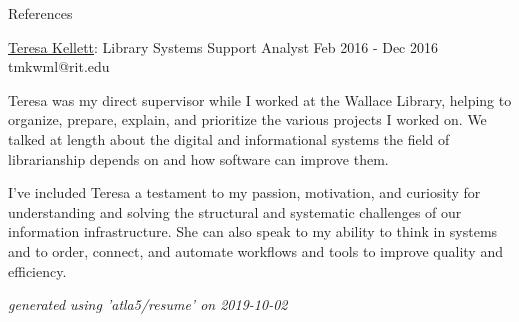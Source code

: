 \documentclass{resume} %
\begin{document}
\begin{rSection}{References}
\begin{rSubsection}{\underline{Teresa Kellett}: Library Systems Support Analyst }{ Feb 2016 - Dec 2016 }{tmkwml@rit.edu}
      \item Teresa was my direct supervisor while I worked at the Wallace Library, helping to organize, prepare, explain, and prioritize the various projects I worked on. We talked at length about the digital and informational systems the field of librarianship depends on and how software can improve them. \newline

      \item I've included Teresa a testament to my passion, motivation, and curiosity for understanding and solving the structural and systematic challenges of our information infrastructure. She can also speak to my ability to think in systems and to order, connect, and automate workflows and tools to improve quality and efficiency. \newline

    \end{rSubsection}

  \end{rSection}

  \begin{flushright}
    \em{generated using 'atla5/resume' on 2019-10-02}
  \end{flushright}
\end{document}
